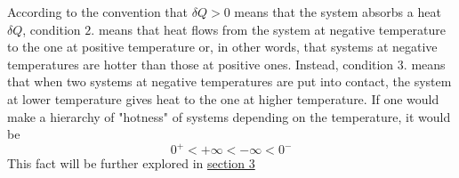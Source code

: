 According to the convention that $\delta Q > 0$ means that the system absorbs a heat $\delta Q$, condition $2.$ means that heat flows from the system at negative temperature to the one at positive temperature or, in other words, that
systems at negative temperatures are hotter than those at positive ones. Instead, condition $3.$ means that when two systems at negative temperatures are put into contact, the system at lower temperature gives heat to the one at higher temperature. If one would make
a hierarchy of "hotness" of systems depending on the temperature, it would be 
\begin{equation*}
    0^+ < +\infty < -\infty < 0^-
\end{equation*}
This fact will be further explored in \hyperref[sec:TLS]{section 3}